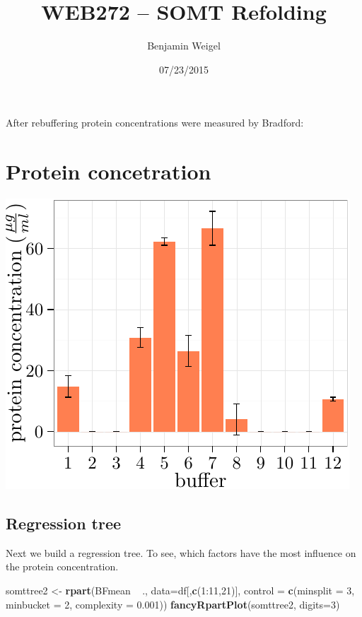 \documentclass[]{article}
\title{WEB272 -- SOMT Refolding}
\author{Benjamin Weigel}
\date{07/23/2015}
\newenvironment{Shaded}{\begin{snugshade}}{\end{snugshade}}
\newcommand{\KeywordTok}[1]{\textcolor[rgb]{0.13,0.29,0.53}{\textbf{{#1}}}}
\newcommand{\DataTypeTok}[1]{\textcolor[rgb]{0.13,0.29,0.53}{{#1}}}
\newcommand{\DecValTok}[1]{\textcolor[rgb]{0.00,0.00,0.81}{{#1}}}
\newcommand{\FloatTok}[1]{\textcolor[rgb]{0.00,0.00,0.81}{{#1}}}
\newcommand{\StringTok}[1]{\textcolor[rgb]{0.31,0.60,0.02}{{#1}}}
\newcommand{\NormalTok}[1]{{#1}}
\begin{document}
\maketitle


{
\hypersetup{linkcolor=black}
\setcounter{tocdepth}{2}
\tableofcontents
}
After rebuffering protein concentrations were measured by Bradford:

\section{Protein concetration}\label{protein-concetration}

\includegraphics{analysis_files/figure-latex/unnamed-chunk-2-1.pdf}

\subsection{Regression tree}\label{regression-tree}

Next we build a regression tree. To see, which factors have the most
influence on the protein concentration.

\begin{Shaded}
\begin{Highlighting}[]
\NormalTok{somttree2 <-}\StringTok{ }\KeywordTok{rpart}\NormalTok{(BFmean ~}\StringTok{ }\NormalTok{., }
                \DataTypeTok{data=}\NormalTok{df[,}\KeywordTok{c}\NormalTok{(}\DecValTok{1}\NormalTok{:}\DecValTok{11}\NormalTok{,}\DecValTok{21}\NormalTok{)],}
                \DataTypeTok{control =} \KeywordTok{c}\NormalTok{(}\DataTypeTok{minsplit =} \DecValTok{3}\NormalTok{,}
                            \DataTypeTok{minbucket =} \DecValTok{2}\NormalTok{,}
                            \DataTypeTok{complexity =} \FloatTok{0.001}\NormalTok{))}
\KeywordTok{fancyRpartPlot}\NormalTok{(somttree2, }\DataTypeTok{digits=}\DecValTok{3}\NormalTok{)}
\end{Highlighting}
\end{Shaded}
\end{document}
